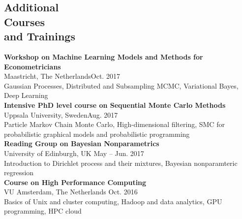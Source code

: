 \documentclass[margin,line]{resume}
\begin{document}
\begin{resume}
   \section{\mysidestyle Additional\\ Courses \\and Trainings} 
	\textbf{Workshop on Machine Learning Models and Methods for Econometricians}\\
        Maastricht, The Netherlands\hfill Oct. 2017\\
        Gaussian Processes, Distributed and Subsampling MCMC, Variational Bayes,  Deep Learning\vspace{1.5mm} \\	\textbf{Intensive PhD level course on Sequential Monte Carlo Methods}\\
        Uppsala University, Sweden\hfill Aug. 2017\\
        Particle Markov Chain Monte Carlo, High-dimensional filtering, SMC for probabilistic graphical models and probabilistic programming\vspace{1.5mm} \\   
	\textbf{Reading Group on Bayesian Nonparametrics}\\
        University of Edinburgh, UK \hfill May -- Jun. 2017\\
        Introduction to Dirichlet process and their mixtures, Bayesian nonparamteric regression\vspace{1.5mm} \\
	\textbf{Course on High Performance Computing}\\
        VU Amsterdam, The Netherlands \hfill Oct. 2016\\
        Basics of Unix and cluster computing,  Hadoop and data analytics, GPU programming, HPC cloud\vspace{1.5mm} \\
%   
%

\end{resume}
\end{document}
